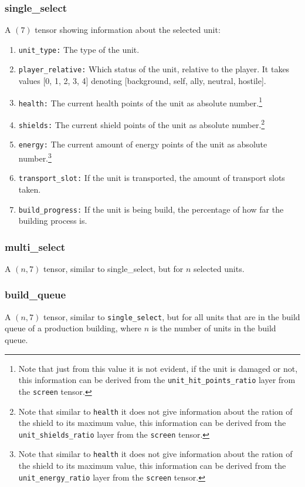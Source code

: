 \documentclass{article}
\begin{document}
\subsubsection{single\_select}
A $(7)$ tensor showing information about the selected unit:
\begin{enumerate}[noitemsep,start=0]	\item \texttt{unit\_type:} The type of 
the unit.
\item \texttt{player\_relative:} Which status of the unit, relative to the 
player. It takes values [0, 1, 2, 3, 4] denoting [background, self, ally, 
neutral, hostile].
\item \texttt{health:} The current health points of the unit as absolute 
number.\footnote{Note  that just from this value it is not evident, if the unit 
is damaged or not, this information can be derived from the 
\texttt{unit\_hit\_points\_ratio} layer from the \texttt{screen} tensor.}
\item \texttt{shields:} The current shield points of the unit as absolute 
number.\footnote{Note that similar to \texttt{health} it does not give 
information about the ration of the shield to its maximum value, this 
information can be derived from the \texttt{unit\_shields\_ratio} layer from 
the \texttt{screen} tensor.}
\item \texttt{energy:} The current amount of energy points of the unit as 
absolute number.\footnote{Note that similar to \texttt{health} it does not give 
information about the ration of the shield to its maximum value, this 
information can be derived from the \texttt{unit\_energy\_ratio} layer from the 
\texttt{screen} tensor.}
\item \texttt{transport\_slot:} If the unit is transported, the amount of 
transport slots taken.
\item \texttt{build\_progress:} If the unit is being build, the percentage of 
how far the building process is.
\end{enumerate}


\subsubsection{multi\_select}
A $(n,7)$ tensor, similar to single\_select, but for $n$ selected units.


\subsubsection{build\_queue}
A $(n, 7)$ tensor, similar to \texttt{single\_select}, but for all units that 
are in the build queue of a production building, where $n$ is the number of 
units in the build queue.
\end{document}
